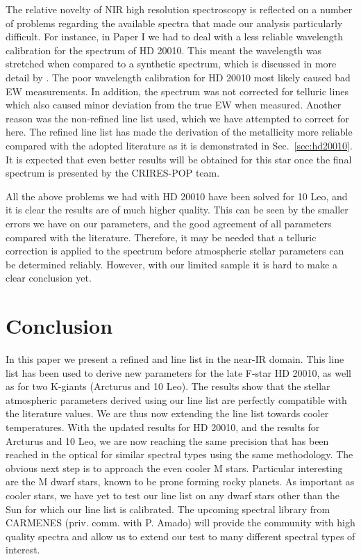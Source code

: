 \documentclass{aa}
\begin{document}
The relative novelty of NIR high resolution spectroscopy is reflected on a
number of problems regarding the available spectra that made our analysis
particularly difficult. For instance, in Paper I we had to deal with a less
reliable wavelength calibration for the spectrum of HD 20010. This meant the
wavelength was stretched when compared to a synthetic spectrum, which is
discussed in more detail by \citet{Nicholls2016}. The poor wavelength
calibration for HD 20010 most likely caused bad EW measurements. In addition,
the spectrum was not corrected for telluric lines which also caused minor
deviation from the true EW when measured. Another reason was the non-refined
line list used, which we have attempted to correct for here. The refined line
list has made the derivation of the metallicity more reliable compared with the
adopted literature as it is demonstrated in Sec.~\ref{sec:hd20010}. It is
expected that even better results will be obtained for this star once the final
spectrum is presented by the CRIRES-POP team.

All the above problems we had with HD 20010 have been solved for 10 Leo, and it
is clear the results are of much higher quality. This can be seen by the smaller
errors we have on our parameters, and the good agreement of all parameters
compared with the literature. Therefore, it may be needed that a telluric
correction is applied to the spectrum before atmospheric stellar parameters can
be determined reliably. However, with our limited sample it is hard to make a
clear conclusion yet.



\section{Conclusion}
\label{sec:conclusion}

In this paper we present a refined  and  line list in the
near-IR domain. This line list has been used to derive new parameters for the
late F-star HD 20010, as well as for two K-giants (Arcturus and 10 Leo). The
results show that the stellar atmospheric parameters derived using our line list
are perfectly compatible with the literature values. We are thus now extending
the line list towards cooler temperatures. With the updated results for HD
20010, and the results for Arcturus and 10 Leo, we are now reaching the same
precision that has been reached in the optical for similar spectral types using
the same methodology. The obvious next step is to approach the even cooler M
stars. Particular interesting are the M dwarf stars, known to be prone forming
rocky planets. As important as cooler stars, we have yet to test our line list
on any dwarf stars other than the Sun for which our line list is calibrated. The
upcoming spectral library from CARMENES (priv. comm. with P. Amado) will provide
the community with high quality spectra and allow us to extend our test to many
different spectral types of interest.
\end{document}
